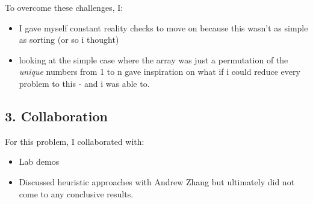\documentclass[a4paper,12pt]{article}
\begin{document}
To overcome these challenges, I:
\begin{itemize}
    \item I gave myself constant reality checks to move on because this wasn't as simple as sorting (or so i thought)
    \item looking at the simple case where the array was just a permutation of the \emph{unique} numbers from 1 to n gave inspiration on what if i could reduce every problem to this - and i was able to.
\end{itemize}

\subsection*{3. Collaboration}
For this problem, I collaborated with:
\begin{itemize}
    \item Lab demos
    \item Discussed heuristic approaches with Andrew Zhang but ultimately did not come to any conclusive results.
\end{itemize}
\end{document}
